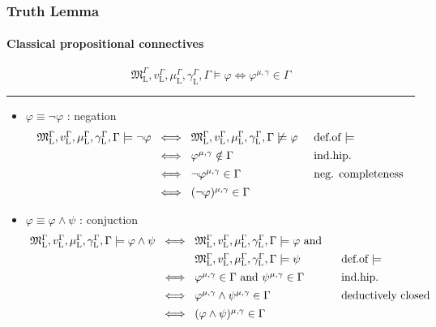\documentclass[xcolor=x11names]{beamer}
\newenvironment{tomb}[2][.1]{\arraycolsep=#1cm\begin{array}{#2}}{\end{array}}
\begin{document}
\begin{frame}[t]
\frametitle{Truth Lemma}\framesubtitle{Classical propositional connectives}
\scriptsize
\[
\mathfrak M_{\mathrm L}^\Gamma, v_{\mathrm L}^\Gamma, \mu_{\mathrm L}^\Gamma, \gamma_{\mathrm L}^\Gamma, \Gamma \models \varphi
\iff  \varphi^{\mu, \gamma} \in \Gamma\]
\hrule
\bigskip

\begin{itemize}
\item $\varphi \equiv \lnot \varphi$ : negation
 \[
  \begin{tomb}{rclll}
            \mathfrak M_{\mathrm L}^{\Gamma}, v_{\mathrm L}^\Gamma, \mu_{\mathrm L}^\Gamma, \gamma_{\mathrm L}^\Gamma, \Gamma  \models \lnot \varphi
    &\iff &   \mathfrak M_{\mathrm L}^{\Gamma}, v_{\mathrm L}^\Gamma, \mu_{\mathrm L}^\Gamma, \gamma_{\mathrm L}^\Gamma, \Gamma  \not \models \varphi
     &\;& \textup{def.of $\models$}
\\[1ex] &\iff & \varphi^{\mu, \gamma}\notin \Gamma
     &\;& \textup{ind.hip.}
\\[1ex] &\iff & \lnot \varphi^{\mu, \gamma}\in \Gamma
     &\;& \textup{neg. completeness}
\\[1ex] &\iff & (\lnot \varphi)^{\mu, \gamma}\in \Gamma
 \end{tomb}\]
\item $\varphi \equiv \varphi\land \psi$ : conjuction
 \[
  \begin{tomb}{rclll}
            \mathfrak M_{\mathrm L}^{\Gamma}, v_{\mathrm L}^\Gamma, \mu_{\mathrm L}^\Gamma, \gamma_{\mathrm L}^\Gamma, \Gamma  \models \varphi \land \psi
    &\iff &   \mathfrak M_{\mathrm L}^{\Gamma}, v_{\mathrm L}^\Gamma, \mu_{\mathrm L}^\Gamma, \gamma_{\mathrm L}^\Gamma, \Gamma  \models \varphi
              \textup{ and }
   \\[1ex]&&           \mathfrak M_{\mathrm L}^{\Gamma}, v_{\mathrm L}^\Gamma, \mu_{\mathrm L}^\Gamma, \gamma_{\mathrm L}^\Gamma, \Gamma  \models \psi     &\;& \textup{def.of $\models$}
\\[1ex]  &\iff & \varphi^{\mu, \gamma}\in \Gamma\textup{ and } \psi^{\mu, \gamma}\in \Gamma
     &\;& \textup{ind.hip.}
\\[1ex]  &\iff & \varphi^{\mu, \gamma}\land \psi^{\mu, \gamma}\in \Gamma
     &\;& \textup{deductively closed}
\\[1ex]  &\iff & (\varphi\land \psi)^{\mu, \gamma}\in \Gamma
 \end{tomb}\]
\end{itemize}
\end{frame}
\end{document}
